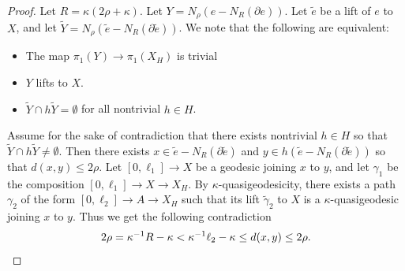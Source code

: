 \documentclass[article, 12pt]{amsart}
\numberwithin{equation}{section}
\theoremstyle{definition}
\newcommand{\ii}{^{-1}}
\newcommand{\tild}[1]{\widetilde{#1}}
\begin{document}
\begin{proof}
    Let $R=\kappa(2\rho+\kappa)$.
    Let $Y=N_\rho(e-N_{R}(\partial e))$. 
    Let $\tilde e$ be a lift of  $e$ to $X$, and let $\tild Y = N_\rho(\tild e-N_{R}(\partial \tild e))$. 
    We note that the following are equivalent: 
    \begin{itemize}
        \item The map $\pi_1(Y) \to \pi_1(X_H)$ is trivial
        \item $Y$ lifts to $X$.
        \item $\tild Y\cap h\tild Y= \emptyset$ for all nontrivial $h\in H$.
    \end{itemize} 
    Assume for the sake of contradiction that there exists nontrivial $h\in H$ so that $\tild Y\cap h\tild Y\neq \emptyset.$
    Then there exists $x\in \tilde e - N_R(\partial \tilde e)$ and $y\in h(\tilde e - N_R(\partial \tilde e))$ so that $d(x,y)\leq 2\rho$.
    Let $[0,\ell_1]\to X$ be a geodesic joining $x$ to $y$, and let $\gamma_1$ be the composition $[0,\ell_1]\to X\to X_H$.
    By $\kappa$-quasigeodesicity, there exists a path $\gamma_2$ of the form $[0,\ell_2]\to A\to X_H$ such that its lift $\tild \gamma_2$ to $X$ is a $\kappa$-quasigeodesic joining $x$ to $y$.
    Thus we get the following contradiction
    $$2\rho=\kappa\ii R-\kappa < \kappa\ii \ell_2 -\kappa\le d(x,y)\le 2\rho. \qedhere$$
\end{proof}
\end{document}
